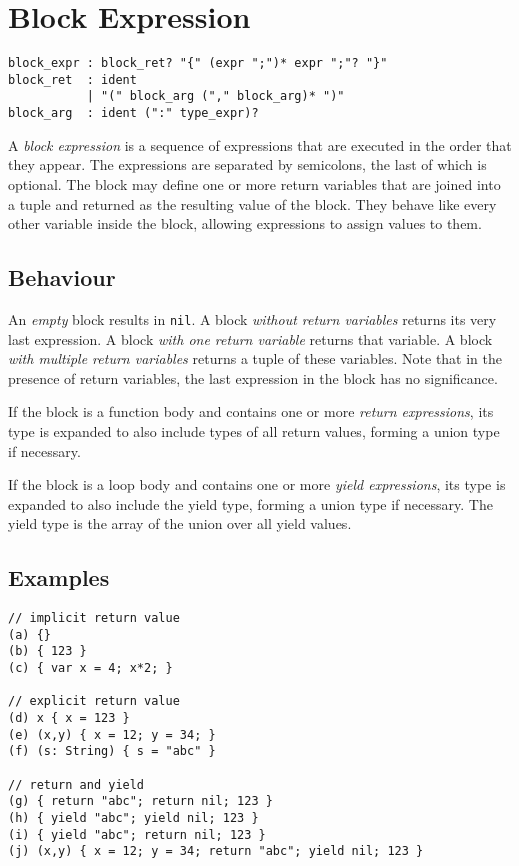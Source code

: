 \section{Block Expression}

\begin{verbatim}
block_expr : block_ret? "{" (expr ";")* expr ";"? "}"
block_ret  : ident
           | "(" block_arg ("," block_arg)* ")"
block_arg  : ident (":" type_expr)?
\end{verbatim}

A \emph{block expression} is a sequence of expressions that are executed in the
order that they appear. The expressions are separated by semicolons, the last of
which is optional. The block may define one or more return variables that are
joined into a tuple and returned as the resulting value of the block. They
behave like every other variable inside the block, allowing expressions to
assign values to them.

\subsection{Behaviour}

An \emph{empty} block results in \texttt{nil}. A block \emph{without return
variables} returns its very last expression. A block \emph{with one return
variable} returns that variable. A block \emph{with multiple return variables}
returns a tuple of these variables. Note that in the presence of return
variables, the last expression in the block has no significance.

If the block is a function body and contains one or more \emph{return
expressions}, its type is expanded to also include types of all return values,
forming a union type if necessary.

If the block is a loop body and contains one or more \emph{yield expressions},
its type is expanded to also include the yield type, forming a union type if
necessary. The yield type is the array of the union over all yield values.

\subsection{Examples}

\begin{verbatim}
// implicit return value
(a) {}
(b) { 123 }
(c) { var x = 4; x*2; }

// explicit return value
(d) x { x = 123 }
(e) (x,y) { x = 12; y = 34; }
(f) (s: String) { s = "abc" }

// return and yield
(g) { return "abc"; return nil; 123 }
(h) { yield "abc"; yield nil; 123 }
(i) { yield "abc"; return nil; 123 }
(j) (x,y) { x = 12; y = 34; return "abc"; yield nil; 123 }
\end{verbatim}

